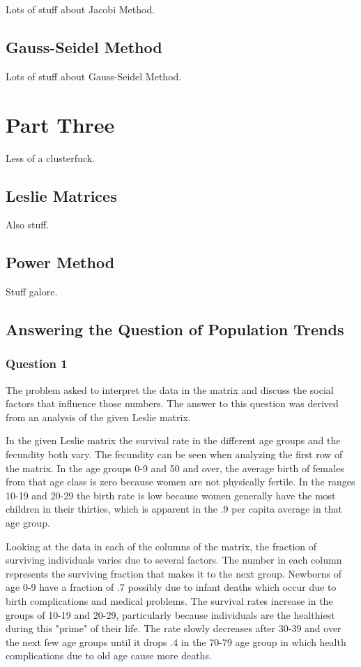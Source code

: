 \documentclass[letterpaper,11pt]{article}
\begin{document}
Lots of stuff about Jacobi Method.

\subsection{Gauss-Seidel Method}

Lots of stuff about Gauss-Seidel Method.

\newpage
\section{Part Three}


Less of a clusterfuck.

\subsection{Leslie Matrices}

Also stuff.

\subsection{Power Method}

Stuff galore.

\subsection{Answering the Question of Population Trends}

\subsubsection{Question 1}

The problem asked to interpret the data in the matrix and discuss the social factors that influence those numbers.
The answer to this question was derived from an analysis of the given Leslie matrix.

In the given Leslie matrix the survival rate in the different age groups and the fecundity both vary.
The fecundity can be seen when analyzing the first row of the matrix.
In the age groups 0-9 and 50 and over, the average birth of females from that age class is zero because women are not physically fertile.
In the ranges 10-19 and 20-29 the birth rate is low because women generally have the most children in their thirties,
which is apparent in the .9 per capita average in that age group. 

Looking at the data in each of the columns of the matrix, the fraction of surviving individuals varies due to several factors.
The number in each column represents the surviving fraction that makes it to the next group.
Newborns of age 0-9 have a fraction of .7 possibly due to infant deaths which occur due to birth complications and medical problems.
The survival rates increase in the groups of 10-19 and 20-29, particularly because individuals are the healthiest during this "prime"
of their life.
The rate slowly decreases after 30-39 and over the next few age groups until it drops .4 in the 70-79 age group in which health
complications due to old age cause more deaths.
\end{document}
